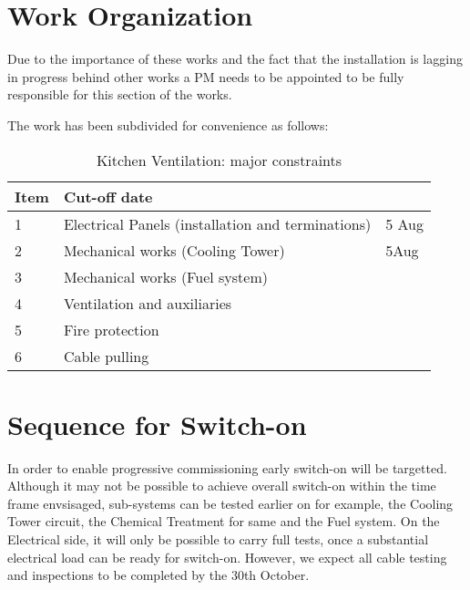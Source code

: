 \section{Work Organization}
Due to the importance of these works and the fact that the installation is lagging in progress behind other works a PM needs to be appointed to be fully responsible for this section of the works.

The work has been subdivided for convenience as follows:

\begin{table}[htbp] 
	    \begin{tabular}{l p{4cm}l}
	      \toprule
	     Item & Cut-off date  \\
	      \midrule
                  1 &Electrical Panels (installation and terminations) & 5 Aug\\
                  2 &Mechanical works (Cooling Tower) &5Aug \\
                  3 &Mechanical works (Fuel system)     &       \\
                  4 &Ventilation and auxiliaries               &       \\
                  5 & Fire protection                              &        \\
                  6 & Cable pulling                                 &       \\
	       \bottomrule
	    \end{tabular}
           \caption{Kitchen Ventilation:  major constraints}
            \end{table}


\section{Sequence for Switch-on}
\normalsize
In order to enable progressive commissioning early switch-on will be targetted. Although it may not be possible to achieve overall switch-on within the time frame envsisaged, sub-systems can be tested earlier on for example, the Cooling Tower circuit, the Chemical Treatment for same and the Fuel system. On the Electrical side, it will only be possible to carry full tests, once a substantial electrical load can be ready for switch-on. However, we expect all cable testing and inspections to be completed by the 30th October.

